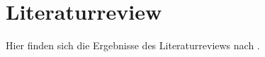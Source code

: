 \section{Literaturreview}
\label{anh:Anh-Literaturreview}

Hier finden sich die Ergebnisse des Literaturreviews nach \cite{Webster2002}.
%
%